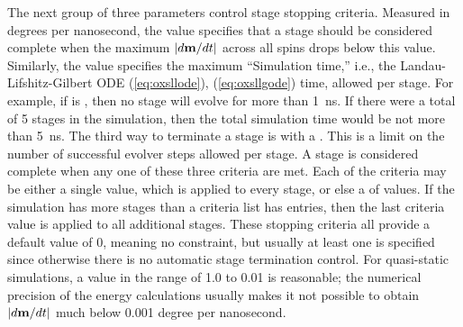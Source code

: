 \begin{description}
The next group of three parameters control stage stopping criteria.
Measured in degrees per nanosecond, the 
value specifies that a stage should be considered complete when the
maximum $|d\textbf{m}/dt|$ across all spins drops below this value.  Similarly,
the  value specifies the maximum ``Simulation
time,'' i.e., the Landau-Lifshitz-Gilbert ODE (\ref{eq:oxsllode}),
(\ref{eq:oxsllgode}) time, allowed per stage.  For example, if
 is
, then no stage will evolve for more than
1~ns.  If there were a total of 5 stages in the simulation, then the
total simulation time would be not more than 5~ns.  The third way to
terminate a stage is with a .  This is
a limit on the number of successful evolver steps allowed per stage.  A
stage is considered complete when any one of these three criteria are
met.  Each of the criteria may be either a single value, which is
applied to every stage, or else a
 of values.  If the
simulation has more stages than a criteria list has entries, then the
last criteria value is applied to all additional stages.  These stopping
criteria all provide a default value of 0, meaning no constraint, but
usually at least one is specified since otherwise there is no automatic
stage termination control.  For quasi-static simulations, a
 value in the range of 1.0 to 0.01 is reasonable;
the numerical precision of the energy calculations usually makes it not
possible to obtain $|d\textbf{m}/dt|$ much below 0.001 degree per nanosecond.



\end{description}
